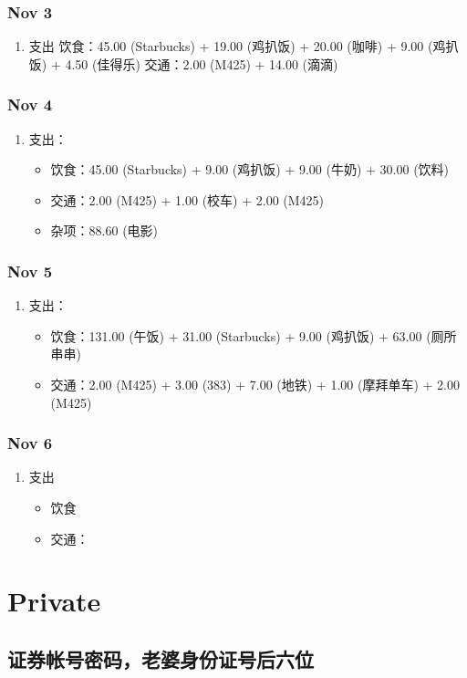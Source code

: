 \documentclass[11pt]{article}
\begin{document}
\subsubsection{Nov 3}
\label{sec:orgheadline35}
\begin{enumerate}
\item 支出
饮食：45.00 (Starbucks) + 19.00 (鸡扒饭) + 20.00 (咖啡) + 9.00 (鸡扒饭) + 4.50 (佳得乐)
交通：2.00 (M425) + 14.00 (滴滴)
\end{enumerate}
\subsubsection{Nov 4}
\label{sec:orgheadline36}
\begin{enumerate}
\item 支出：
\begin{itemize}
\item 饮食：45.00 (Starbucks) + 9.00 (鸡扒饭) + 9.00 (牛奶) + 30.00 (饮料)
\item 交通：2.00 (M425) + 1.00 (校车) + 2.00 (M425)
\item 杂项：88.60 (电影)
\end{itemize}
\end{enumerate}
\subsubsection{Nov 5}
\label{sec:orgheadline37}
\begin{enumerate}
\item 支出： 
\begin{itemize}
\item 饮食：131.00 (午饭) + 31.00 (Starbucks) + 9.00 (鸡扒饭) + 63.00 (厕所串串)
\item 交通：2.00 (M425) + 3.00 (383) + 7.00 (地铁) + 1.00 (摩拜单车) + 2.00 (M425)
\end{itemize}
\end{enumerate}
\subsubsection{Nov 6}
\label{sec:orgheadline38}
\begin{enumerate}
\item 支出
\begin{itemize}
\item 饮食
\item 交通：
\end{itemize}
\end{enumerate}
\section{Private}
\label{sec:orgheadline42}

\subsection{证券帐号密码，老婆身份证号后六位}
\label{sec:orgheadline41}
\end{document}
